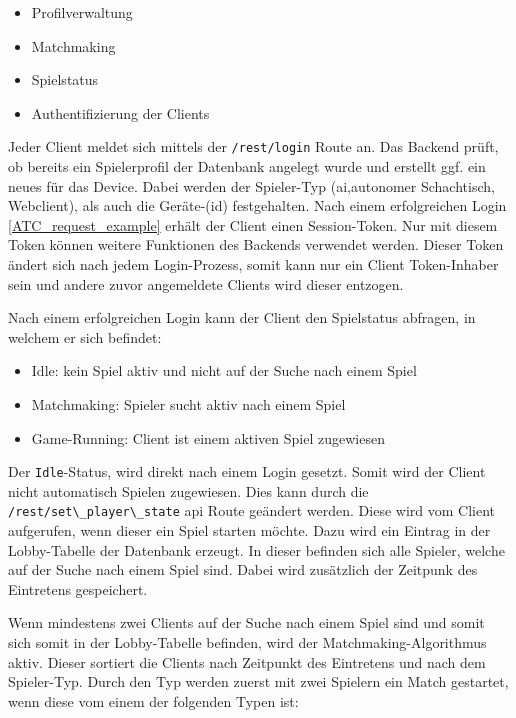 \begin{itemize}
\tightlist
\item
  Profilverwaltung
\item
  Matchmaking
\item
  Spielstatus
\item
  Authentifizierung der Clients
\end{itemize}

Jeder Client meldet sich mittels der
\passthrough{\lstinline!/rest/login!} Route an. Das Backend prüft, ob
bereits ein Spielerprofil der Datenbank angelegt wurde und erstellt ggf.
ein neues für das Device. Dabei werden der Spieler-Typ
(\gls{ai},autonomer Schachtisch, Webclient), als auch die Geräte-(id)
festgehalten. Nach einem erfolgreichen Login \ref{ATC_request_example}
erhält der Client einen Session-Token. Nur mit diesem Token können
weitere Funktionen des Backends verwendet werden. Dieser Token ändert
sich nach jedem Login-Prozess, somit kann nur ein Client Token-Inhaber
sein und andere zuvor angemeldete Clients wird dieser entzogen.

Nach einem erfolgreichen Login kann der Client den Spielstatus abfragen,
in welchem er sich befindet:

\begin{itemize}
\tightlist
\item
  Idle: kein Spiel aktiv und nicht auf der Suche nach einem Spiel
\item
  Matchmaking: Spieler sucht aktiv nach einem Spiel
\item
  Game-Running: Client ist einem aktiven Spiel zugewiesen
\end{itemize}

Der \passthrough{\lstinline!Idle!}-Status, wird direkt nach einem Login
gesetzt. Somit wird der Client nicht automatisch Spielen zugewiesen.
Dies kann durch die \passthrough{\lstinline!/rest/set\_player\_state!}
\gls{api} Route geändert werden. Diese wird vom Client aufgerufen, wenn
dieser ein Spiel starten möchte. Dazu wird ein Eintrag in der
Lobby-Tabelle der Datenbank erzeugt. In dieser befinden sich alle
Spieler, welche auf der Suche nach einem Spiel sind. Dabei wird
zusätzlich der Zeitpunk des Eintretens gespeichert.

Wenn mindestens zwei Clients auf der Suche nach einem Spiel sind und
somit sich somit in der Lobby-Tabelle befinden, wird der
Matchmaking-Algorithmus aktiv. Dieser sortiert die Clients nach
Zeitpunkt des Eintretens und nach dem Spieler-Typ. Durch den Typ werden
zuerst mit zwei Spielern ein Match gestartet, wenn diese vom einem der
folgenden Typen ist:

